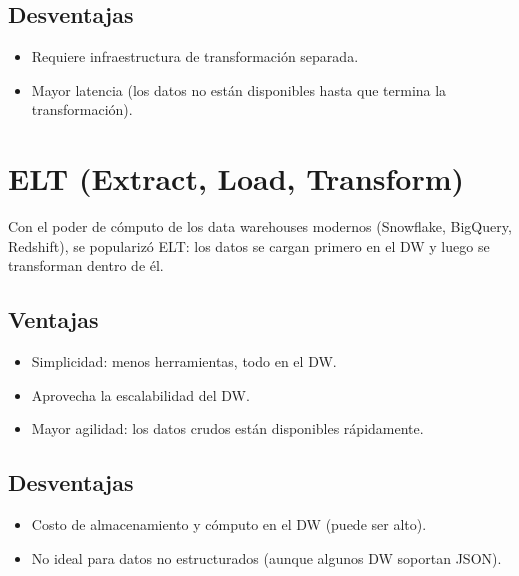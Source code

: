 \documentclass[12pt,a4paper,openany,oneside]{book}
\begin{document}
\subsection{Desventajas}
\begin{itemize}
    \item Requiere infraestructura de transformación separada.
    \item Mayor latencia (los datos no están disponibles hasta que termina la transformación).
\end{itemize}

\section{ELT (Extract, Load, Transform)}
Con el poder de cómputo de los data warehouses modernos (Snowflake, BigQuery, Redshift), se popularizó ELT: los datos se cargan primero en el DW y luego se transforman dentro de él.

\begin{center}
\end{center}

\subsection{Ventajas}
\begin{itemize}
    \item Simplicidad: menos herramientas, todo en el DW.
    \item Aprovecha la escalabilidad del DW.
    \item Mayor agilidad: los datos crudos están disponibles rápidamente.
\end{itemize}
\subsection{Desventajas}
\begin{itemize}
    \item Costo de almacenamiento y cómputo en el DW (puede ser alto).
    \item No ideal para datos no estructurados (aunque algunos DW soportan JSON).
\end{itemize}
\end{document}
